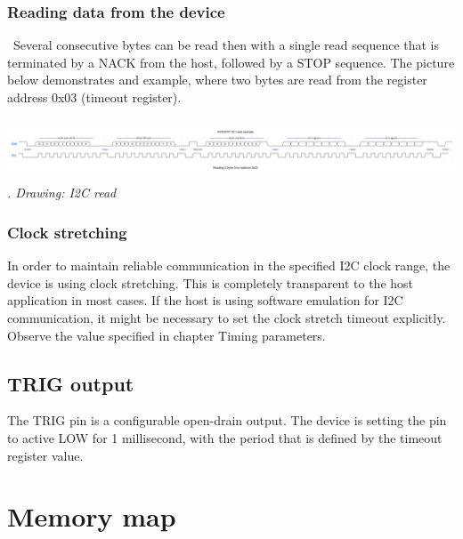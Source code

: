 \documentclass[a4paper]{article}
\newcounter{Drawing}
\renewcommand\theDrawing{\arabic{Drawing}}
\begin{document}
\subsubsection[Reading data from the device]{ Reading data from the device}
\hypertarget{RefHeadingToc12311084818799}{}{
\ Several consecutive bytes can be read then with a single read sequence that is terminated by a NACK from the host,
followed by a STOP sequence. The picture below demonstrates and example, where two bytes are read from the register
address 0x03 (timeout register).}



\begin{center}
\begin{minipage}{6.9252in}
{\itshape
 \includegraphics[width=6.9252in,height=0.722in]{HVSUP01UM-img003.png} \stepcounter{Drawing}{\theDrawing}. Drawing: I2C
read}
\end{minipage}
\end{center}
\subsubsection[Clock stretching]{ Clock stretching}
\hypertarget{RefHeadingToc10431084818799}{}{
In order to maintain reliable communication in the specified I2C clock range, the device is using clock stretching. This
is completely transparent to the host application in most cases. If the host is using software emulation for I2C
communication, it might be necessary to set the clock stretch timeout explicitly. Observe the value specified in
chapter Timing parameters.}

\subsection[TRIG output]{ TRIG output}
\hypertarget{RefHeadingToc1302441299070}{}{
The TRIG pin is a configurable open-drain output. The device is setting the pin to active LOW for 1 millisecond, with
the period that is defined by the timeout register value.}

\clearpage\section[Memory map]{ Memory map}
\hypertarget{RefHeadingToc1391383566216}{}
\bigskip
\end{document}
